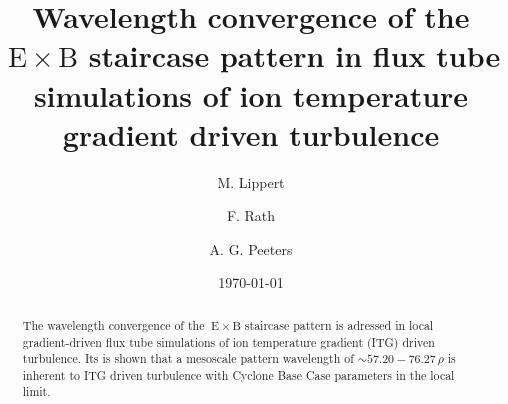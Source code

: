 \documentclass[aip, amsmath, amssymb, reprint, twocolumn, floatfix]{revtex4-1}
\newcommand{\exb}{\mathrm{\:E}\times\mathrm{B}}
\newcommand{\rhoth}{\rho}
\begin{document}

\title[Wavelength convergence of the $\exb$ staircase pattern in flux tube simulations of ion temperature gradient driven turbulence]
{Wavelength convergence of the $\exb$ staircase pattern in flux tube simulations of ion temperature gradient driven turbulence}

\author{M. Lippert}
\author{F. Rath}
\author{A. G. Peeters}

\date{\today}


\begin{abstract}
    The wavelength convergence of the $\exb$ staircase pattern is adressed in local gradient-driven flux tube simulations of ion temperature gradient (ITG) driven turbulence.
    Its is shown that a mesoscale pattern wavelength of \linebreak $\sim 57.20-76.27\,\rhoth$ is inherent to ITG driven turbulence with Cyclone Base Case parameters in the local limit. 
    
\end{abstract}

\maketitle



\end{document}

